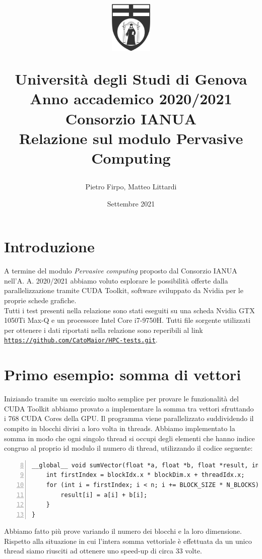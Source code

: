 \documentclass[a4paper,11pt]{article}
\title{
    \vspace{-1.6cm}
    \begin{center}
        \includegraphics[width=2cm]{logo_bn.png}
    \end{center}
    \vspace{0.6cm}
    \textbf{Università degli Studi di Genova}\\
    \vspace{0.2cm}
    \textbf{Anno accademico 2020/2021}\\
    \vspace{0.6cm}
    \Large
    Consorzio IANUA\\
    \vspace{0.2cm}
    Relazione sul modulo Pervasive Computing
}
\author{Pietro Firpo, Matteo Littardi}
\date{Settembre 2021}
\begin{document}
\maketitle
\thispagestyle{Titolo}

\section{Introduzione}
A termine del modulo \textit{Pervasive computing} proposto dal Consorzio IANUA nell'A. A. 2020/2021 abbiamo voluto esplorare le possibilità offerte dalla parallelizzazione tramite CUDA Toolkit, software sviluppato da Nvidia per le proprie schede grafiche. \\
Tutti i test presenti nella relazione sono stati eseguiti su una scheda Nvidia GTX 1050Ti Max-Q e un processore Intel Core i7-9750H. Tutti file sorgente utilizzati per ottenere i dati riportati nella relazione sono reperibili al link \href{https://github.com/CatoMaior/HPC-tests.git}{\texttt{https://github.com/CatoMaior/HPC-tests.git}}.

\section{Primo esempio: somma di vettori}
Iniziando tramite un esercizio molto semplice per provare le funzionalità del CUDA Toolkit abbiamo provato a implementare la somma tra vettori sfruttando i 768 CUDA Cores della GPU. Il programma viene parallelizzato suddividendo il compito in blocchi divisi a loro volta in threads. Abbiamo implementato la somma in modo che ogni singolo thread si occupi degli elementi che hanno indice congruo al proprio id modulo il numero di thread, utilizzando il codice seguente:

\begin{Verbatim}[numbers=left, frame=single, firstnumber=8]
__global__ void sumVector(float *a, float *b, float *result, int n) {
    int firstIndex = blockIdx.x * blockDim.x + threadIdx.x;
    for (int i = firstIndex; i < n; i += BLOCK_SIZE * N_BLOCKS) {
        result[i] = a[i] + b[i];
    }
}
\end{Verbatim}

Abbiamo fatto più prove variando il numero dei blocchi e la loro dimensione. Rispetto alla situazione in cui l'intera somma vettoriale è effettuata da un unico thread siamo riusciti ad ottenere uno speed-up di circa 33 volte. 
\end{document}
